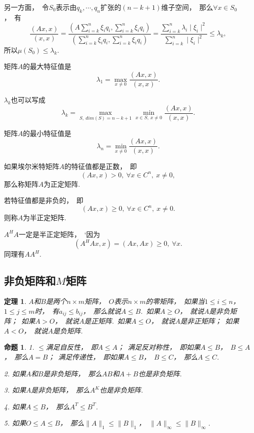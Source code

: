 \documentclass{article}
\begin{document}
另一方面，~令$S_0$表示由$q_k,\cdots,q_n$扩张的$(n-k+1)$维子空间，~那么$\forall x\in S_0$，~有
$$\frac{(Ax,x)}{(x,x)}=\frac{(A\sum_{i=k}^n\xi_iq_i,\sum_{i=k}^n\xi_iq_i)}{(\sum_{i=k}^n\xi_iq_i,\sum_{i=k}^n\xi_iq_i)}=\frac{\sum_{i=k}^n\lambda _i\mid\xi _i\mid ^2}{\sum_{i=k}^n\mid\xi _i\mid ^2}\le\lambda _k,$$
所以$\mu (S_0)\le\lambda _k$.

矩阵$A$的最大特征值是
$$\lambda _1=\max \limits_{x\neq 0}\frac{(Ax,x)}{(x,x)}.$$

$\lambda _k$也可以写成$$\lambda _k=\max \limits_{S,\ dim(S)=n-k+1} \min \limits_{x\in S,\ x\neq 0}\frac{(Ax,x)}{(x,x)}.$$

矩阵$A$的最小特征值是$$\lambda _n=\min \limits_{x\neq 0}\frac{(Ax,x)}{(x,x)}.$$

如果埃尔米特矩阵$A$的特征值都是正数，\ 即$$(Ax,x)>0,\ \forall x\in C^n,\ x\neq 0,$$
那么称矩阵$A$为正定矩阵.

若特征值都是非负的，~即$$(Ax,x)\ge 0,\ \forall x\in C^n,\ x\neq 0.$$则称$A$为半正定矩阵.

$A^HA$一定是半正定矩阵，~`因为$$(A^HAx,x)=(Ax,Ax)\ge 0,\ \forall x.$$
同理有$AA^H$.

\subsection{非负矩阵和$M$矩阵}
\newtheorem{definition}{定理}
\begin{definition}
$A$和$B$是两个$n\times m$矩阵，~$O$表示$n\times m$的零矩阵，~如果当$1\le i\le n$，~$1\le j\le m$时，~有$a_{ij}\le b_{ij}$，~那么就说$A\le B$.~如果$A\ge O$，~就说$A$是非负矩阵；~如果$A>O$，~就说$A$是正矩阵.~如果$A\le O$，~就说$A$是非正矩阵；~如果$A<O$，~就说$A$是负矩阵.
\end{definition}

\newtheorem{proposition}{命题}
\begin{proposition}

1. $\le$满足自反性，~即$A\le A$；~满足反对称性，~即如果$A\le B$，~$B\le A$，~那么$A=B$；~满足传递性，~即如果$A\le B$，~$B\le C$，~那么$A\le C$.

2. 如果$A$和$B$是非负矩阵，~那么$AB$和$A+B$也是非负矩阵.

3. 如果$A$是非负矩阵，~那么$A^K$也是非负矩阵.

4. 如果$A\le B$，~那么$A^T\le B^T$.

5. 如果$O\le A\le B$，~那么$\parallel A\parallel _1\le\parallel B\parallel _1$，~$\parallel A\parallel _{\infty}\le\parallel B\parallel _{\infty}$.
\end{proposition}
\end{document}
